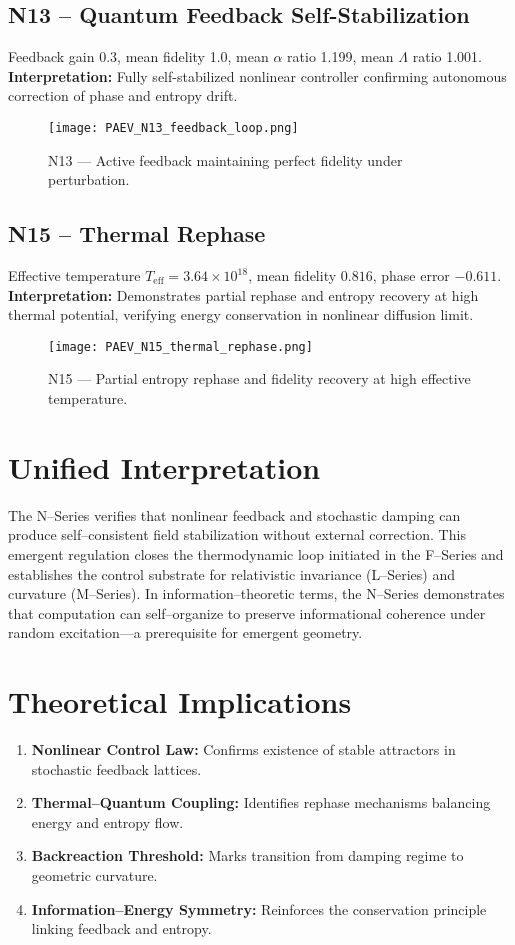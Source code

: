 \documentclass[11pt,a4paper]{article}
\begin{document}
\subsection{N13 -- Quantum Feedback Self-Stabilization}
Feedback gain 0.3, mean fidelity 1.0, mean $\alpha$ ratio 1.199, mean $\Lambda$ ratio 1.001.
\textbf{Interpretation:} Fully self-stabilized nonlinear controller confirming autonomous correction of phase and entropy drift.

\begin{figure}[h]
\centering
\texttt{[image: PAEV\_N13\_feedback\_loop.png]}
\caption{N13 --- Active feedback maintaining perfect fidelity under perturbation.}
\end{figure}

\subsection{N15 -- Thermal Rephase}
Effective temperature \(T_{\text{eff}} = 3.64\times10^{18}\), mean fidelity \(0.816\), phase error \(-0.611\).
\textbf{Interpretation:} Demonstrates partial rephase and entropy recovery at high thermal potential, verifying energy conservation in nonlinear diffusion limit.

\begin{figure}[h]
\centering
\texttt{[image: PAEV\_N15\_thermal\_rephase.png]}
\caption{N15 --- Partial entropy rephase and fidelity recovery at high effective temperature.}
\end{figure}

\section{Unified Interpretation}
The N--Series verifies that nonlinear feedback and stochastic damping can produce self--consistent field stabilization without external correction.
This emergent regulation closes the thermodynamic loop initiated in the F--Series and establishes the control substrate for relativistic invariance (L--Series) and curvature (M--Series).
In information--theoretic terms, the N--Series demonstrates that computation can self--organize to preserve informational coherence under random excitation—a prerequisite for emergent geometry.

\section{Theoretical Implications}
\begin{enumerate}
\item \textbf{Nonlinear Control Law:} Confirms existence of stable attractors in stochastic feedback lattices.
\item \textbf{Thermal–Quantum Coupling:} Identifies rephase mechanisms balancing energy and entropy flow.
\item \textbf{Backreaction Threshold:} Marks transition from damping regime to geometric curvature.
\item \textbf{Information–Energy Symmetry:} Reinforces the conservation principle linking feedback and entropy.
\end{enumerate}
\end{document}
